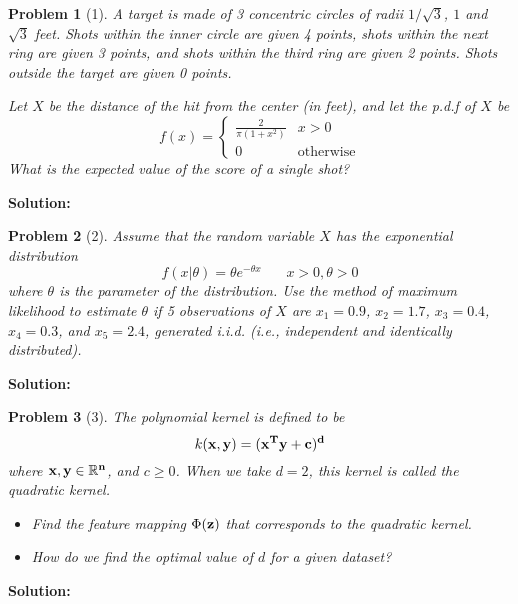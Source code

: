 \documentclass[11pt]{article}
\theoremstyle{quest}
\newtheorem*{question}{Problem}
\begin{document}

\begin{question}[1]
A target is made of 3 concentric circles of radii $1/{\sqrt{3}}$, $1$ and $\sqrt{3}$ feet. Shots within the inner circle are given 4 points, shots within the next ring are given 3 points, and shots within the third ring are given 2 points. Shots outside the target are given 0 points.

Let $X$ be the distance of the hit from the center (in feet), and let the p.d.f of $X$ be
\[
f(x) =
  \begin{cases}
   \frac{2}{\pi (1+x^2)} & x>0 \\
   0 &  \text{otherwise}
  \end{cases}
\]
What is the expected value of the score of a single shot?
\end{question}
\textbf{Solution:}
\newpage


\begin{question}[2]
Assume that the random variable $X$ has the exponential distribution
\[
f(x|\theta) = \theta e^{-\theta x} \ \ \ \ \ \ \ \ x > 0, \theta > 0
\]
where $\theta$ is the parameter of the distribution. Use the method of maximum likelihood to estimate $\theta$ if 5 observations of $X$ are $x_1 = 0.9$, $x_2 = 1.7$, $x_3 = 0.4$, $x_4 = 0.3$, and $x_5 = 2.4$, generated i.i.d. (i.e., independent and identically distributed).
\end{question}
\textbf{Solution:}
\newpage


\begin{question}[3]
The polynomial kernel is defined to be
\[
k(\bf{x},\bf{y}) = (\bf{x}^T\bf{y} + c)^d
\]
where $\bf{x},\bf{y} \in \mathbb{R}^n$, and $c \geq 0$. When we take $d=2$, this kernel is called the quadratic kernel.
\begin{itemize}
\item[(a)] Find the feature mapping $\Phi(\bf{z})$ that corresponds to the quadratic kernel.
\item[(b)] How do we find the optimal value of $d$ for a given dataset?
\end{itemize}
\end{question}
\textbf{Solution:}
\newpage
\end{document}
